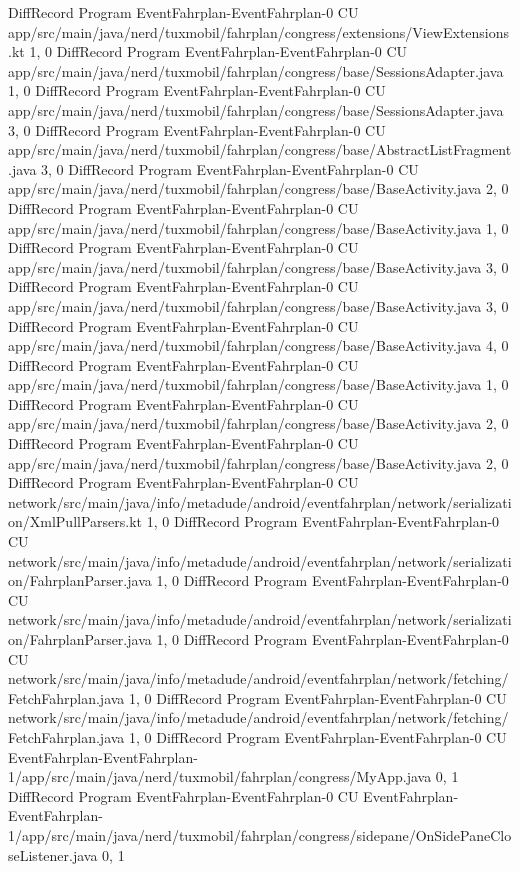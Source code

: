 DiffRecord Program EventFahrplan-EventFahrplan-0 CU app/src/main/java/nerd/tuxmobil/fahrplan/congress/extensions/ViewExtensions.kt  {1, 0}
DiffRecord Program EventFahrplan-EventFahrplan-0 CU app/src/main/java/nerd/tuxmobil/fahrplan/congress/base/SessionsAdapter.java  {1, 0}
DiffRecord Program EventFahrplan-EventFahrplan-0 CU app/src/main/java/nerd/tuxmobil/fahrplan/congress/base/SessionsAdapter.java  {3, 0}
DiffRecord Program EventFahrplan-EventFahrplan-0 CU app/src/main/java/nerd/tuxmobil/fahrplan/congress/base/AbstractListFragment.java  {3, 0}
DiffRecord Program EventFahrplan-EventFahrplan-0 CU app/src/main/java/nerd/tuxmobil/fahrplan/congress/base/BaseActivity.java  {2, 0}
DiffRecord Program EventFahrplan-EventFahrplan-0 CU app/src/main/java/nerd/tuxmobil/fahrplan/congress/base/BaseActivity.java  {1, 0}
DiffRecord Program EventFahrplan-EventFahrplan-0 CU app/src/main/java/nerd/tuxmobil/fahrplan/congress/base/BaseActivity.java  {3, 0}
DiffRecord Program EventFahrplan-EventFahrplan-0 CU app/src/main/java/nerd/tuxmobil/fahrplan/congress/base/BaseActivity.java  {3, 0}
DiffRecord Program EventFahrplan-EventFahrplan-0 CU app/src/main/java/nerd/tuxmobil/fahrplan/congress/base/BaseActivity.java  {4, 0}
DiffRecord Program EventFahrplan-EventFahrplan-0 CU app/src/main/java/nerd/tuxmobil/fahrplan/congress/base/BaseActivity.java  {1, 0}
DiffRecord Program EventFahrplan-EventFahrplan-0 CU app/src/main/java/nerd/tuxmobil/fahrplan/congress/base/BaseActivity.java  {2, 0}
DiffRecord Program EventFahrplan-EventFahrplan-0 CU app/src/main/java/nerd/tuxmobil/fahrplan/congress/base/BaseActivity.java  {2, 0}
DiffRecord Program EventFahrplan-EventFahrplan-0 CU network/src/main/java/info/metadude/android/eventfahrplan/network/serialization/XmlPullParsers.kt  {1, 0}
DiffRecord Program EventFahrplan-EventFahrplan-0 CU network/src/main/java/info/metadude/android/eventfahrplan/network/serialization/FahrplanParser.java  {1, 0}
DiffRecord Program EventFahrplan-EventFahrplan-0 CU network/src/main/java/info/metadude/android/eventfahrplan/network/serialization/FahrplanParser.java  {1, 0}
DiffRecord Program EventFahrplan-EventFahrplan-0 CU network/src/main/java/info/metadude/android/eventfahrplan/network/fetching/FetchFahrplan.java  {1, 0}
DiffRecord Program EventFahrplan-EventFahrplan-0 CU network/src/main/java/info/metadude/android/eventfahrplan/network/fetching/FetchFahrplan.java  {1, 0}
DiffRecord Program EventFahrplan-EventFahrplan-0 CU EventFahrplan-EventFahrplan-1/app/src/main/java/nerd/tuxmobil/fahrplan/congress/MyApp.java  {0, 1}
DiffRecord Program EventFahrplan-EventFahrplan-0 CU EventFahrplan-EventFahrplan-1/app/src/main/java/nerd/tuxmobil/fahrplan/congress/sidepane/OnSidePaneCloseListener.java  {0, 1}

